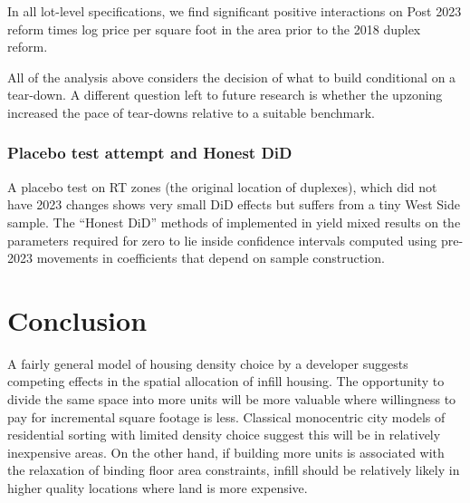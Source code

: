 \documentclass[12pt]{article}
\begin{document}
\begin{table}[htbp]
	\centering
	\caption{\label{tab:LogitDiD}Lot-level difference in differences (equation \ref{eq:LogitDiD}): duplex versus single family new-build permits on 33' lots now zoned R1, September 2018 to November 2026, with twelve-month period fixed effects. Fixed effects columns include area fixed effects; ppsf control columns replace them with the area's log price per square foot. Standard errors clustered by area in parentheses (model-based for the conditional logit); $^{*}$, $^{**}$, $^{***}$: significant at 10, 5, 1\%. Wild cluster restricted bootstrap $p$-values use \sdNBoot{} draws with Webb weights. Spatial standard errors in brackets \parencite{Conley1999}: Bartlett kernel in distance between lots, \lgConleyKm{} km cutoff. Odds ratio: $\exp(\beta_{1}\times$ West minus East gap in mean log ppsf). The neighbourhood fixed effect logit drops \lgNbhdAreasDropped{} neighbourhood in which every permit is for the same product.}
	
\end{table}

In all lot-level specifications, we find significant positive interactions on Post 2023 reform times log price per square foot in the area prior to the 2018 duplex reform.

All of the analysis above considers the decision of what to build conditional on a tear-down. A different question left to future research is whether the upzoning increased the pace of tear-downs relative to a suitable benchmark. 

\subsubsection{Placebo test attempt and Honest DiD}
A placebo test on RT zones (the original location of duplexes), which did not have 2023 changes shows very small DiD effects but suffers from a tiny West Side sample. The ``Honest DiD'' methods of \textcite{RambachanRoth2023} implemented in \textcite{RambachanRoth2026HonestDiD} yield mixed results on the parameters required for zero to lie inside confidence intervals computed using pre-2023 movements in coefficients that depend on sample construction.

\section{\label{sec:conclusion}Conclusion}

A fairly general model of housing density choice by a developer suggests competing effects in the spatial allocation of infill housing. The opportunity to divide the same space into more units will be more valuable where willingness to pay for incremental square footage is less. Classical monocentric city models of residential sorting with limited density choice suggest this will be in relatively inexpensive areas. On the other hand, if building more units is associated with the relaxation of binding floor area constraints, infill should be relatively likely in higher quality locations where land is more expensive.
\end{document}
